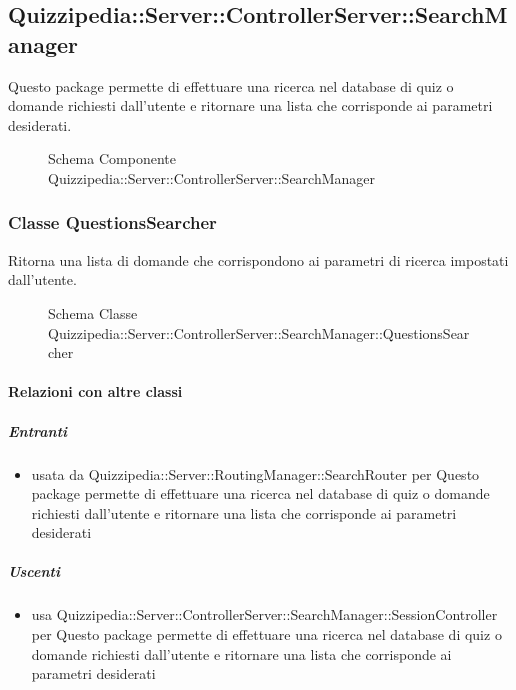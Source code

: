 \subsection{Quizzipedia::Server::ControllerServer::SearchManager}
Questo package permette di effettuare una ricerca nel database di quiz o domande richiesti dall'utente e ritornare una lista che corrisponde ai parametri desiderati.
\begin{figure}[H]
\centering
\noindent{}
\caption[Schema Componente Quizzipedia::Server::ControllerServer::SearchManager]{Schema Componente Quizzipedia::Server::ControllerServer::SearchManager}
\end{figure}
\subsubsection{Classe QuestionsSearcher}
Ritorna una lista di domande che corrispondono ai parametri di ricerca impostati dall'utente.
\begin{figure}[H]
\centering
\noindent{}
\caption[Schema Classe QuestionsSearcher]{Schema Classe Quizzipedia::Server::ControllerServer::SearchManager::QuestionsSearcher}
\end{figure}
\paragraph{Relazioni con altre classi}
\subparagraph{Entranti}
\begin{itemize}
\item usata da Quizzipedia::Server::RoutingManager::SearchRouter per Questo package permette di effettuare una ricerca nel database di quiz o domande richiesti dall'utente e ritornare una lista che corrisponde ai parametri desiderati
\end{itemize}
\subparagraph{Uscenti}
\begin{itemize}
\item usa Quizzipedia::Server::ControllerServer::SearchManager::SessionController per Questo package permette di effettuare una ricerca nel database di quiz o domande richiesti dall'utente e ritornare una lista che corrisponde ai parametri desiderati
\end{itemize}
